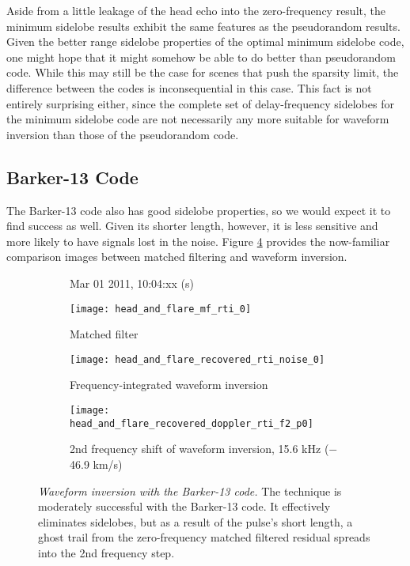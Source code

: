 Aside from a little leakage of the head echo into the zero-frequency result, the minimum sidelobe results exhibit the same features as the pseudorandom results. Given the better range sidelobe properties of the optimal minimum sidelobe code, one might hope that it might somehow be able to do better than pseudorandom code. While this may still be the case for scenes that push the sparsity limit, the difference between the codes is inconsequential in this case. This fact is not entirely surprising either, since the complete set of delay-frequency sidelobes for the minimum sidelobe code are not necessarily any more suitable for waveform inversion than those of the pseudorandom code.

\subsection{Barker-13 Code}
The Barker-13 code also has good sidelobe properties, so we would expect it to find success as well. Given its shorter length, however, it is less sensitive and more likely to have signals lost in the noise. Figure \ref{fig:b13_comparison} provides the now-familiar comparison images between matched filtering and waveform inversion.
\begin{figure}[tpb]
 \vspace{-1.5\baselineskip}
 \begin{subfigure}{\textwidth}
  \centering
  \textsf{\footnotesize Mar 01 2011, 10:04:xx (s)}
  
  \texttt{[image: head\_and\_flare\_mf\_rti\_0]}
  \caption{Matched filter}
  \label{fig:b13_mf}
 \end{subfigure}
 
 \vspace{0.5\baselineskip}
 \begin{subfigure}{\textwidth}
  \centering
  \texttt{[image: head\_and\_flare\_recovered\_rti\_noise\_0]}
  \caption{Frequency-integrated waveform inversion}
  \label{fig:b13_recovered}
 \end{subfigure}
 
 \vspace{0.5\baselineskip}
 \begin{subfigure}{\textwidth}
  \centering
  \texttt{[image: head\_and\_flare\_recovered\_doppler\_rti\_f2\_p0]}
  \caption{2nd frequency shift of waveform inversion, 15.6 kHz ($-$46.9 km/s)}
  \label{fig:b13_recovered_dopplerslice}
 \end{subfigure}
 \caption[Waveform inversion with the Barker-13 code]{\emph{Waveform inversion with the Barker-13 code.} The technique is moderately successful with the Barker-13 code. It effectively eliminates sidelobes, but as a result of the pulse's short length, a ghost trail from the zero-frequency matched filtered residual spreads into the 2nd frequency step.}
 \label{fig:b13_comparison}
\end{figure}%
